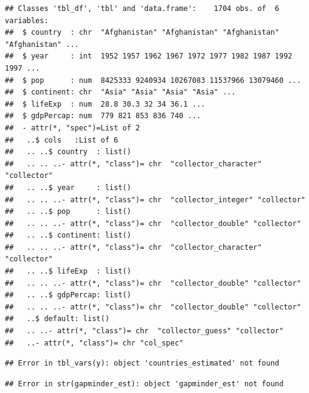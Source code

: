 \documentclass[]{book}
\newenvironment{Shaded}{\begin{snugshade}}{\end{snugshade}}
\newcommand{\KeywordTok}[1]{\textcolor[rgb]{0.13,0.29,0.53}{\textbf{#1}}}
\newcommand{\DataTypeTok}[1]{\textcolor[rgb]{0.13,0.29,0.53}{#1}}
\newcommand{\StringTok}[1]{\textcolor[rgb]{0.31,0.60,0.02}{#1}}
\newcommand{\CommentTok}[1]{\textcolor[rgb]{0.56,0.35,0.01}{\textit{#1}}}
\newcommand{\OperatorTok}[1]{\textcolor[rgb]{0.81,0.36,0.00}{\textbf{#1}}}
\newcommand{\NormalTok}[1]{#1}
\theoremstyle{definition}
\theoremstyle{definition}
\theoremstyle{definition}
\theoremstyle{remark}
\begin{document}
\begin{verbatim}
## Classes 'tbl_df', 'tbl' and 'data.frame':    1704 obs. of  6 variables:
##  $ country  : chr  "Afghanistan" "Afghanistan" "Afghanistan" "Afghanistan" ...
##  $ year     : int  1952 1957 1962 1967 1972 1977 1982 1987 1992 1997 ...
##  $ pop      : num  8425333 9240934 10267083 11537966 13079460 ...
##  $ continent: chr  "Asia" "Asia" "Asia" "Asia" ...
##  $ lifeExp  : num  28.8 30.3 32 34 36.1 ...
##  $ gdpPercap: num  779 821 853 836 740 ...
##  - attr(*, "spec")=List of 2
##   ..$ cols   :List of 6
##   .. ..$ country  : list()
##   .. .. ..- attr(*, "class")= chr  "collector_character" "collector"
##   .. ..$ year     : list()
##   .. .. ..- attr(*, "class")= chr  "collector_integer" "collector"
##   .. ..$ pop      : list()
##   .. .. ..- attr(*, "class")= chr  "collector_double" "collector"
##   .. ..$ continent: list()
##   .. .. ..- attr(*, "class")= chr  "collector_character" "collector"
##   .. ..$ lifeExp  : list()
##   .. .. ..- attr(*, "class")= chr  "collector_double" "collector"
##   .. ..$ gdpPercap: list()
##   .. .. ..- attr(*, "class")= chr  "collector_double" "collector"
##   ..$ default: list()
##   .. ..- attr(*, "class")= chr  "collector_guess" "collector"
##   ..- attr(*, "class")= chr "col_spec"
\end{verbatim}

\begin{Shaded}
\end{Shaded}

\begin{verbatim}
## Error in tbl_vars(y): object 'countries_estimated' not found
\end{verbatim}

\begin{Shaded}
\end{Shaded}

\begin{verbatim}
## Error in str(gapminder_est): object 'gapminder_est' not found
\end{verbatim}
\end{document}
